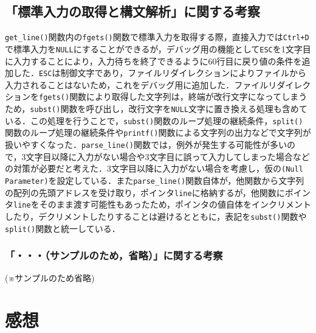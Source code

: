 \subsection{「標準入力の取得と構文解析」に関する考察}

\verb|get_line()|関数内の\verb|fgets()|関数で標準入力を取得する際，直接入力では\verb|Ctrl+D|で標準入力を\verb|NULL|にすることができるが，デバッグ用の機能として\verb|ESC|を1文字目に入力することにより，入力待ちを終了できるように60行目に戻り値の条件を追加した．\verb|ESC|は制御文字であり，ファイルリダイレクションによりファイルから入力されることはないため，これをデバッグ用に追加した\cite{www:label2}．ファイルリダイレクションを\verb|fgets()|関数により取得した文字列は，終端が改行文字になってしまうため，\verb|subst()|関数を呼び出し，改行文字を\verb|NULL|文字に置き換える処理も含めている．この処理を行うことで，\verb|subst()|関数のループ処理の継続条件，\verb|split()|関数のループ処理の継続条件や\verb|printf()|関数による文字列の出力などで文字列が扱いやすくなった．\verb|parse_line()|関数では，例外が発生する可能性が多いので，3文字目以降に入力がない場合や3文字目に誤って入力してしまった場合などの対策が必要だと考えた．3文字目以降に入力がない場合を考慮し，仮の\verb|(Null Parameter)|を設定している．また\verb|parse_line()|関数自体が，他関数から文字列の配列の先頭アドレスを受け取り，ポインタ\verb|line|に格納するが，他関数にポインタ\verb|line|をそのまま渡す可能性もあったため，ポインタの値自体をインクリメントしたり，デクリメントしたりすることは避けるとともに，表記を\verb|subst()|関数や\verb|split()|関数と統一している．

\subsubsection{「・・・（\textbf{サンプルのため，省略}）」に関する考察}

(※サンプルのため省略)



\section{感想}\label{sec:review}

